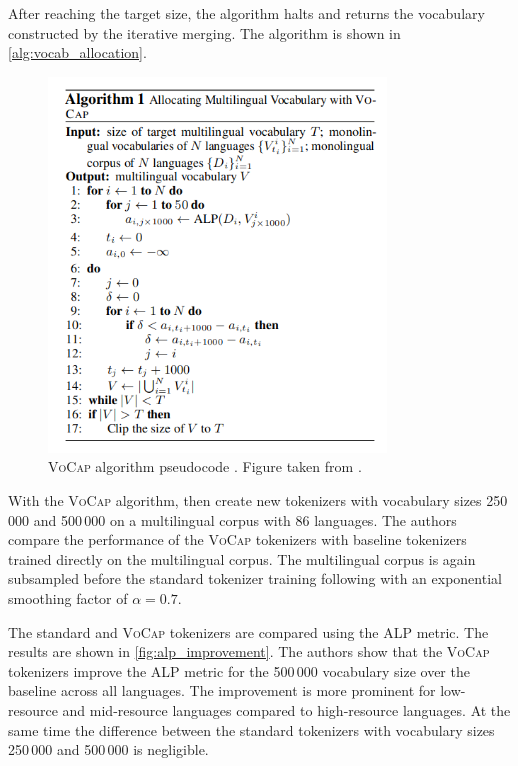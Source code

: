 After reaching the target size, the algorithm halts and returns the vocabulary constructed by the iterative merging. The algorithm is shown in \autoref{alg:vocab_allocation}.

\begin{figure}[ht]
    \centering
    \includegraphics[width=0.8\textwidth]{img/temp/vocap_algo.png}
    \caption{\textsc{VoCap} algorithm pseudocode \cite{zheng_allocating_2021}. Figure taken from \cite{zheng_allocating_2021}.}
    \label{alg:vocab_allocation}
\end{figure}

With the \textsc{VoCap} algorithm,  then create new tokenizers with vocabulary sizes 250\,000 and 500\,000 on a multilingual corpus with 86 languages. The authors compare the performance of the \textsc{VoCap} tokenizers with baseline tokenizers trained directly on the multilingual corpus. The multilingual corpus is again subsampled before the standard tokenizer training following \citet{devlin_bert_2019,lample_cross-lingual_2019} with an exponential smoothing factor of $\alpha=0.7$.

The standard and \textsc{VoCap} tokenizers are compared using the ALP metric. The results are shown in \autoref{fig:alp_improvement}. The authors show that the \textsc{VoCap} tokenizers improve the ALP metric for the 500\,000 vocabulary size over the baseline across all languages. The improvement is more prominent for low-resource and mid-resource languages compared to high-resource languages. At the same time the difference between the standard tokenizers with vocabulary sizes 250\,000 and 500\,000 is negligible.

